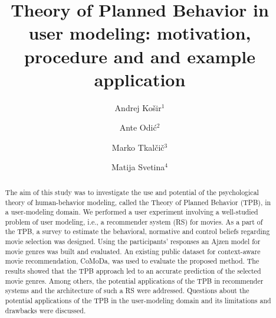 \documentclass{llncs}
\begin{document}
\frontmatter  
{}
\mainmatter 

\title{Theory of Planned Behavior in user modeling: motivation, procedure and and example application}

\author{Andrej Košir$^1$ \and Ante Odić$^2$ \and Marko Tkalčič$^3$ \and Matija Svetina$^4$}


  
\maketitle            

\begin{abstract}
 The aim of this study was to investigate the use and potential of the psychological theory of human-behavior modeling, called the Theory of Planned Behavior (TPB), in a user-modeling domain. We performed a user experiment involving a well-studied problem of user modeling, i.e., a recommender system (RS) for movies. As a part of the TPB, a survey to estimate the behavioral, normative and control beliefs regarding movie selection was designed. Using the participants’ responses an Ajzen model for movie genres was built and evaluated. An existing public dataset for context-aware movie recommendation, CoMoDa, was used to evaluate the proposed method. The results showed that the TPB approach led to an accurate prediction of the selected movie genres. Among others, the potential applications of the TPB in recommender systems and the architecture of such a RS were addressed. Questions about the potential applications of the TPB in the user-modeling domain and its limitations and drawbacks were discussed.
\end{abstract}
\end{document}
